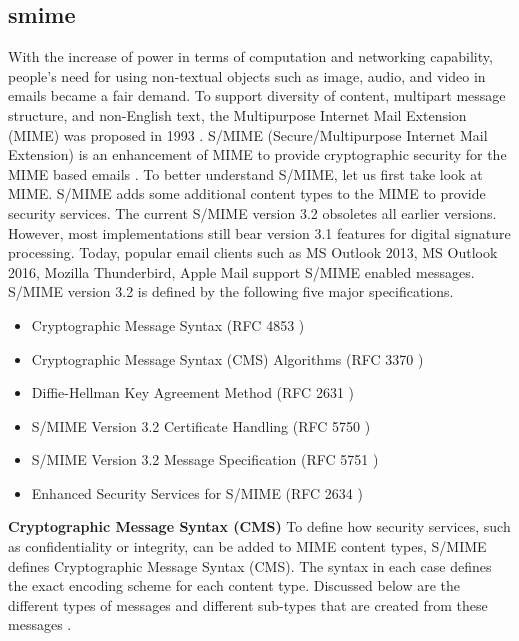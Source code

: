 \subsection{\acrfull{smime}}
\label{chap:analysis-smime}

With the increase of power in terms of computation and networking capability, people's need for using non-textual objects such as image, audio, and video in emails became a fair demand. To support diversity of content, multipart message structure, and non-English text, the Multipurpose Internet Mail Extension (MIME) was proposed in 1993 \cite{rfc1521}. S/MIME (Secure/Multipurpose Internet Mail Extension) is an enhancement of MIME to provide cryptographic security for the MIME based emails \cite{rfc1521}. To better understand S/MIME, let us first take look at MIME.
S/MIME adds some additional content types to the MIME to provide security services. The current S/MIME version 3.2 obsoletes all earlier versions. However, most implementations still bear version 3.1 features for digital signature processing. Today, popular email clients such as MS Outlook 2013, MS Outlook 2016, Mozilla Thunderbird, Apple Mail support S/MIME enabled messages.
S/MIME version 3.2 is defined by the following five major specifications.
\begin{itemize}
\item Cryptographic Message Syntax (RFC 4853 \cite{rfc4853})
\item Cryptographic Message Syntax (CMS) Algorithms (RFC 3370 \cite{rfc3370})
\item Diffie-Hellman Key Agreement Method (RFC 2631 \cite{rfc2631})
\item S/MIME Version 3.2 Certificate Handling (RFC 5750 \cite{rfc5750})
\item S/MIME Version 3.2 Message Specification (RFC 5751 \cite{rfc5751})
\item Enhanced Security Services for S/MIME (RFC 2634 \cite{rfc2634})
\end{itemize}
\textbf{Cryptographic Message Syntax (CMS)}
\newline
To define how security services, such as confidentiality or integrity, can be added to MIME content types, S/MIME defines Cryptographic Message Syntax (CMS). The syntax in each case defines the exact encoding scheme for each content type. Discussed below are the different types of messages and different sub-types that are created from these messages \cite{PKCS-7}.

